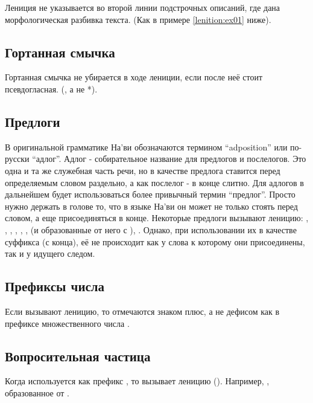 \noindent Лениция не указывается во второй линии подстрочных описаний, где дана мор\-фо\-ло\-ги\-чес\-кая разбивка текста. (Как в примере \ref{lenition:ex01} ниже). 

\subsection{Гортанная смычка} Гортанная смычка не убирается в ходе лениции, если после неё стоит псевдогласная. (, а не *).
\label{l-and-s:lenition:pseudovowel}

\subsection{Предлоги} В оригинальной грамматике На'ви обозначаются термином ``adposition'' или по-русски ``адлог''. Адлог - собирательное название для предлогов и послелогов. Это одна и та же служебная часть речи, но в качестве предлога ставится перед определяемым словом раздельно, а как послелог - в конце слитно. Для адлогов в дальнейшем будет использоваться более привычный термин ``предлог''. Просто нужно держать в голове то, что в языке На'ви он может не только стоять перед словом, а еще присоединяться в конце. Некоторые предлоги вызывают леницию: , , , , , ,
 (и образованные от него  с ), . Однако, при использовании их в качестве суффикса (с конца), её не происходит как у слова к которому они присоединены, так и у идущего следом.

\subsection{Префиксы числа} Если вызывают леницию, то отмечаются знаком плюс, а не дефисом как в префиксе множественного числа . 

\subsection{Вопросительная частица} Когда используется как префикс , то вызывает ле\-ни\-цию (). Например,  , образованное от  .

